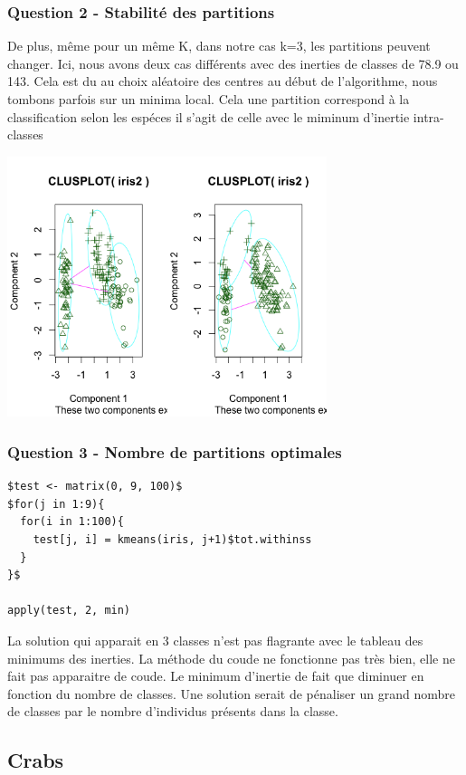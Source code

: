 \documentclass{article}\usepackage[]{graphicx}\usepackage[]{color}
\begin{document}
\subsubsection*{Question 2 - Stabilité des partitions}

De plus, même pour un même K, dans notre cas k=3, les partitions peuvent changer. Ici, nous avons deux cas différents avec des inerties de classes de 78.9 ou 143. Cela est du au choix aléatoire des centres au début de l'algorithme, nous tombons parfois sur un minima local. Cela une partition correspond à la classification selon les espéces il s'agit de celle avec le miminum d'inertie intra-classes

\includegraphics[width=0.7\textwidth]{ex2_iris_2.png}

 
\subsubsection*{Question 3 - Nombre de partitions optimales}

\begin{verbatim}
$test <- matrix(0, 9, 100)$
$for(j in 1:9){
  for(i in 1:100){
    test[j, i] = kmeans(iris, j+1)$tot.withinss
  }
}$

apply(test, 2, min)
\end{verbatim}

La solution qui apparait en 3 classes n'est pas flagrante avec le tableau des minimums des inerties. La méthode du coude ne fonctionne pas très bien, elle ne fait pas apparaitre de coude. Le minimum d'inertie de  fait que diminuer en fonction du nombre de classes. 
Une solution serait de pénaliser un grand nombre de classes par le nombre d'individus présents dans la classe.


\subsection*{Crabs}
\end{document}
